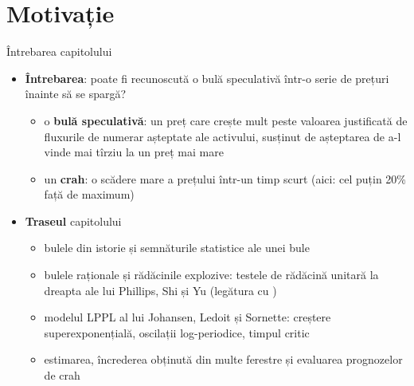 \section{Motivație}

\begin{frame}{Întrebarea capitolului}
\itemsize{\small}
\begin{itemize}
    \item \textbf{Întrebarea}: poate fi recunoscută o bulă speculativă într-o serie de prețuri înainte să se spargă?
    \begin{itemize}
        \item o \textbf{bulă speculativă}: un preț care crește mult peste valoarea justificată de fluxurile de numerar așteptate ale activului, susținut de așteptarea de a-l vinde mai tîrziu la un preț mai mare
        \item un \textbf{crah}: o scădere mare a prețului într-un timp scurt (aici: cel puțin 20\% față de maximum)
    \end{itemize}
    \item \textbf{Traseul} capitolului
    \begin{itemize}
        \item bulele din istorie și semnăturile statistice ale unei bule
        \item bulele raționale și rădăcinile explozive: testele de rădăcină unitară la dreapta ale lui Phillips, Shi și Yu (legătura cu )
        \item modelul LPPL al lui Johansen, Ledoit și Sornette: creștere superexponențială, oscilații log-periodice, timpul critic
        \item estimarea, încrederea obținută din multe ferestre și evaluarea prognozelor de crah
    \end{itemize}
\end{itemize}
\end{frame}

